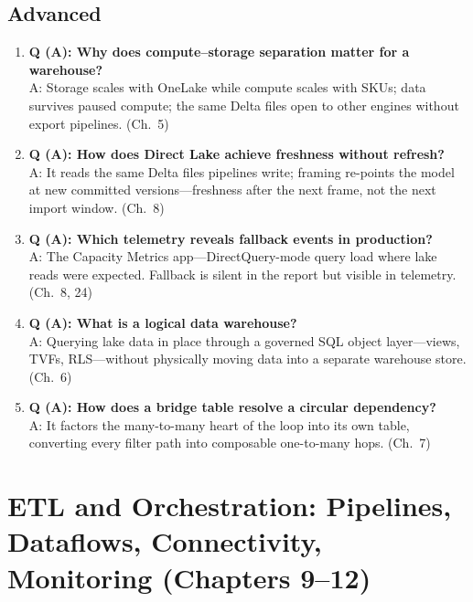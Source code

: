 \subsection*{Advanced}
\begin{enumerate}
    \item \textbf{Q (A): Why does compute--storage separation matter for a warehouse?}\\
    A: Storage scales with OneLake while compute scales with SKUs; data survives paused
    compute; the same Delta files open to other engines without export pipelines. (Ch.~5)
    \item \textbf{Q (A): How does Direct Lake achieve freshness without refresh?}\\
    A: It reads the same Delta files pipelines write; framing re-points the model at new
    committed versions---freshness after the next frame, not the next import window. (Ch.~8)
    \item \textbf{Q (A): Which telemetry reveals fallback events in production?}\\
    A: The Capacity Metrics app---DirectQuery-mode query load where lake reads were expected.
    Fallback is silent in the report but visible in telemetry. (Ch.~8, 24)
    \item \textbf{Q (A): What is a logical data warehouse?}\\
    A: Querying lake data in place through a governed SQL object layer---views, TVFs,
    RLS---without physically moving data into a separate warehouse store. (Ch.~6)
    \item \textbf{Q (A): How does a bridge table resolve a circular dependency?}\\
    A: It factors the many-to-many heart of the loop into its own table, converting every
    filter path into composable one-to-many hops. (Ch.~7)
\end{enumerate}

\section{ETL and Orchestration: Pipelines, Dataflows, Connectivity, Monitoring (Chapters 9--12)}

